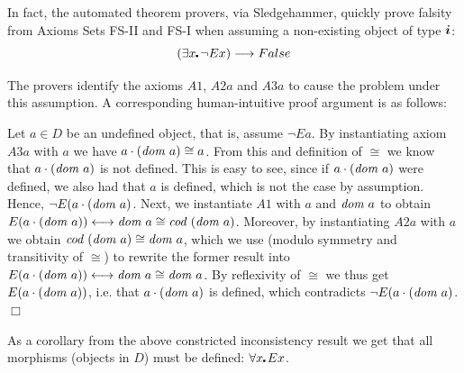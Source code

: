 In fact, the automated theorem provers, via Sledgehammer, quickly
prove falsity from Axioms Sets FS-II and FS-I when assuming a 
 non-existing object of type $\boldsymbol{i}$:
$$(\exists x\lambdot \neg E x) \imp False$$

The provers identify the axioms $A1$,
 $A2a$ and $A3a$ to cause the problem under this assumption. A
 corresponding  human-intuitive proof argument is as follows:
 
 Let $a\in D$ be an undefined object, that is, assume $¬E a$.  By
 instantiating axiom $A3a$ with $a$ we have $a \cdot (\textit{dom \/} a) \cong a$.  From
 this and definition of $\cong$ we know that $a \cdot (\textit{dom \/} a)$ is not
 defined. This is easy to see, since if $a \cdot (\textit{dom \/} a)$ were defined, we
 also had that $a$ is defined, which is not the case by assumption.
  Hence, $\neg E (a \cdot (\textit{dom \/} a)$.
Next, we instantiate $A1$ with $a$ and $\textit{dom \/} a$ to obtain
   $E(a \cdot (\textit{dom \/} a)) \longleftrightarrow \textit{dom \/} a \cong \textit{cod \/}(\textit{dom \/} a)$. Moreover,
   by instantiating $A2a$ with $a$ we obtain $\textit{cod \/}(\textit{dom \/} a) \cong \textit{dom \/} a$,
   which we use (modulo symmetry and transitivity of $\cong$) to
   rewrite the former result into 
   $E(a \cdot (\textit{dom \/} a)) \longleftrightarrow \textit{dom \/} a \cong \textit{dom \/} a$. By reflexivity of
   $\cong$ we thus get $E(a \cdot (\textit{dom \/} a))$, i.e. that $a \cdot
   (\textit{dom \/} a)$ is defined, which contradicts $\neg E (a \cdot (\textit{dom \/}
   a)$. $\Box$

As a corollary from the above constricted inconsistency result we get
that all morphisms (objects in $D$) must be
defined: $\forall x\lambdot E x$.









